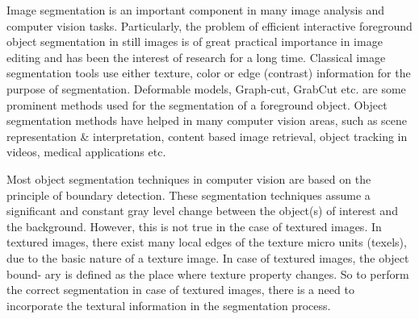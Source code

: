 Image segmentation is an important component in many image analysis and computer vision tasks. Particularly, the problem of efficient interactive foreground object segmentation in still images is of great practical importance in image editing and has been the interest of research for a long time. Classical image segmentation tools use either texture, color or edge (contrast) information for the purpose of segmentation. Deformable models, Graph-cut, GrabCut etc. are some prominent methods used for the segmentation of a foreground object. Object segmentation methods have helped in many computer vision areas, such as scene representation \& interpretation, content based image retrieval, object tracking in videos, medical
applications etc.

Most object segmentation techniques in computer vision are based on the principle of boundary detection. These segmentation techniques assume a significant and constant gray level change between the object(s) of interest and the background. However, this is not true in the case of textured images. In textured
images, there exist many local edges of the texture micro units (texels), due to
the basic nature of a texture image. In case of textured images, the object bound-
ary is defined as the place where texture property changes. So to perform the
correct segmentation in case of textured images, there is a need to incorporate the
textural information in the segmentation process.